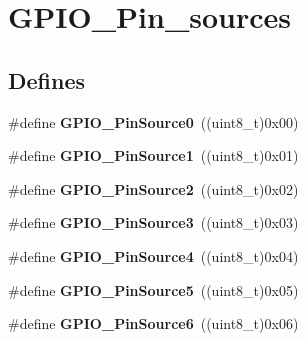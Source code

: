 \hypertarget{group__GPIO__Pin__sources}{
\section{GPIO\_\-Pin\_\-sources}
\label{group__GPIO__Pin__sources}
}
\subsection*{Defines}
\begin{DoxyCompactItemize}
\item 
\hypertarget{group__GPIO__Pin__sources_ga028bcbdf5a7fd81ec45830f60a022bb4}{
\#define {\bfseries GPIO\_\-PinSource0}~((uint8\_\-t)0x00)}
\label{group__GPIO__Pin__sources_ga028bcbdf5a7fd81ec45830f60a022bb4}

\item 
\hypertarget{group__GPIO__Pin__sources_gad02324cdd8526a7aacd15a5a910d56f1}{
\#define {\bfseries GPIO\_\-PinSource1}~((uint8\_\-t)0x01)}
\label{group__GPIO__Pin__sources_gad02324cdd8526a7aacd15a5a910d56f1}

\item 
\hypertarget{group__GPIO__Pin__sources_ga7808fb6269890fa1e37a322418884607}{
\#define {\bfseries GPIO\_\-PinSource2}~((uint8\_\-t)0x02)}
\label{group__GPIO__Pin__sources_ga7808fb6269890fa1e37a322418884607}

\item 
\hypertarget{group__GPIO__Pin__sources_ga0df17fee84ec9ab096b5525a06871863}{
\#define {\bfseries GPIO\_\-PinSource3}~((uint8\_\-t)0x03)}
\label{group__GPIO__Pin__sources_ga0df17fee84ec9ab096b5525a06871863}

\item 
\hypertarget{group__GPIO__Pin__sources_gaf5aa545455dacbf315a40cecd0842b6c}{
\#define {\bfseries GPIO\_\-PinSource4}~((uint8\_\-t)0x04)}
\label{group__GPIO__Pin__sources_gaf5aa545455dacbf315a40cecd0842b6c}

\item 
\hypertarget{group__GPIO__Pin__sources_gaf231e680fe2db4ea44a7fd0f5d5c5875}{
\#define {\bfseries GPIO\_\-PinSource5}~((uint8\_\-t)0x05)}
\label{group__GPIO__Pin__sources_gaf231e680fe2db4ea44a7fd0f5d5c5875}

\item 
\hypertarget{group__GPIO__Pin__sources_gada41b6bd03b2873a2400628df0a1026e}{
\#define {\bfseries GPIO\_\-PinSource6}~((uint8\_\-t)0x06)}
\label{group__GPIO__Pin__sources_gada41b6bd03b2873a2400628df0a1026e}


\end{DoxyCompactItemize}
